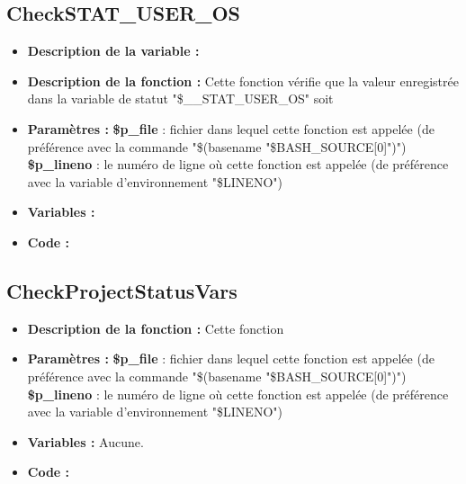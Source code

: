 \documentclass[a4paper,10pt]{article}
\begin{document}
\color{green}
\subsection{CheckSTAT\_USER\_OS}\color{white}
\begin{itemize}
    \item \textbf{Description de la variable :}

    \item \textbf{Description de la fonction :} Cette fonction vérifie que la valeur enregistrée dans la variable de statut "\$\_\_STAT\_USER\_OS" soit

    \item \textbf{Paramètres :}
        \color{orange}\textbf{\$p\_file}\color{white} : fichier dans lequel cette fonction est appelée (de préférence avec la commande "\$(\color{gray}basename \color{white}"\color{orange}\$BASH\_SOURCE[0]\color{white}")")
    \color{orange}\textbf{\$p\_lineno}\color{white} : le numéro de ligne où cette fonction est appelée (de préférence avec la variable d'environnement "\color{orange}\$LINENO\color{white}")

    \item \textbf{Variables :}

    \item \textbf{Code :}
\end{itemize}

\color{green}
\subsection{CheckProjectStatusVars}\color{white}
\begin{itemize}
    \item \textbf{Description de la fonction :} Cette fonction

    \item \textbf{Paramètres :}
        \color{orange}\textbf{\$p\_file}\color{white} : fichier dans lequel cette fonction est appelée (de préférence avec la commande "\$(\color{gray}basename \color{white}"\color{orange}\$BASH\_SOURCE[0]\color{white}")")
    \color{orange}\textbf{\$p\_lineno}\color{white} : le numéro de ligne où cette fonction est appelée (de préférence avec la variable d'environnement "\color{orange}\$LINENO\color{white}")

    \item \textbf{Variables :} Aucune.

    \item \textbf{Code :}
\end{itemize}
\end{document}
